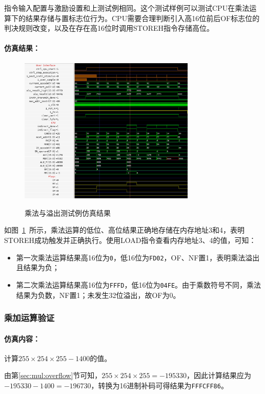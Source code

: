 \documentclass[lang=cn,a4paper,newtx]{elegantpaper}
\begin{document}
指令输入配置与激励设置和上测试例相同。这个测试样例可以测试CPU在乘法运算下的结果存储与置标志位行为。CPU需要合理判断引入高16位前后OF标志位的判决规则改变，以及在存在高16位时调用STOREH指令存储高位。

\paragraph{仿真结果：}
\begin{figure}[htbp]
  \centering
  \caption{乘法与溢出测试例仿真结果}
  \includegraphics[width = 0.75\textwidth]{figure/cpu_sim_mul.png}
  \label{fig:sim:2}
\end{figure}

如图~\ref{fig:sim:2}~所示，乘法运算的低位、高位结果正确地存储在内存地址3和4，表明STOREH成功触发并正确执行。使用LOAD指令查看内存地址3、4的值，可知：
\begin{itemize}
  \item 第一次乘法运算结果高16位为\texttt{0}，低16位为\texttt{FD02}，OF、NF置1，表明乘法溢出且结果为负；
  \item 第二次乘法运算结果高16位为\texttt{FFFD}，低16位为\texttt{04FE}。由于乘数符号不同，乘法结果为负数，NF置1；未发生32位溢出，故OF为0。
\end{itemize}

\subsubsection{乘加运算验证}
\paragraph{仿真内容：}
计算$255\times254\times255 - 1400$的值。

由第\ref{sec:mul:overflow}节可知，$255\times254\times255 = -195330$，因此计算结果应为$-195330 - 1400 = -196730$，转换为16进制补码可得结果为\texttt{FFFCFF86}。
\end{document}
